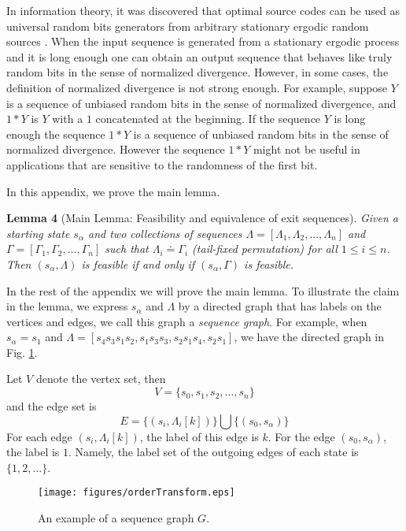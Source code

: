 \documentclass[journal]{IEEEtran}
\def\tmu{\doteq}
\begin{document}
In information theory, it was discovered that optimal source codes can be used as universal random bits generators from arbitrary stationary ergodic random sources \cite{Visweswariah98}\cite{Han05}. When the input sequence is generated from a stationary ergodic process and it is long enough one can obtain an output sequence that behaves like truly random bits in the sense of normalized divergence. However, in some cases, the definition of normalized divergence is not strong enough. For example, suppose $Y$ is a sequence of unbiased random bits in the sense of
normalized divergence, and $1*Y$ is $Y$ with a $1$ concatenated at the beginning. If the sequence $Y$ is long enough the sequence $1*Y$
is a sequence of unbiased random bits in the sense of normalized divergence. However the sequence $1*Y$ might not
be useful in applications that are sensitive to the randomness of the first bit.

\appendix
In this appendix, we prove the main lemma.

{\hspace{-0.3cm}\textbf{Lemma 4} (Main Lemma: Feasibility and equivalence of exit sequences).
\emph
{Given a starting state $s_\alpha$ and two collections of sequences $\Lambda=[\Lambda_1,\Lambda_2,...,\Lambda_n]$ and $\Gamma=[\Gamma_1,\Gamma_2,...,\Gamma_n]$
such that $\Lambda_i \tmu \Gamma_i$ (tail-fixed permutation) for all $1\leq i\leq n$. Then $(s_\alpha, \Lambda)$ is feasible if and only if $(s_\alpha, \Gamma)$ is feasible.}
}
\vspace{0.2cm}

In the rest of the appendix we will prove the main lemma. To illustrate the claim in the lemma, we
express $s_\alpha$ and $\Lambda$ by a directed graph that has labels on the vertices and edges, we call this graph a \emph{sequence graph}. For example, when $s_\alpha=s_1$ and  $\Lambda=[s_4s_3s_1s_2, s_1s_3s_3,s_2s_1s_4,s_2s_1]$, we have the directed graph in Fig. \ref{fig_orderTransform}.

Let $V$ denote the vertex set, then 
$$V=\{s_0,s_1,s_2,...,s_n\}$$
and the edge set is 
$$E=\{(s_i,\Lambda_i[k])\} \bigcup \{(s_0, s_\alpha)\}$$
For each edge $(s_i,\Lambda_i[k])$, the label of this edge is $k$. For the edge $(s_0,s_\alpha)$, the label is $1$.  Namely, the label set of the outgoing edges of each state is $\{1,2,...\}$.

\begin{figure}[!h]
\centering
\texttt{[image: figures/orderTransform.eps]}
\caption{An example of a sequence graph $G$.}
\label{fig_orderTransform}
\end{figure}
\end{document}
